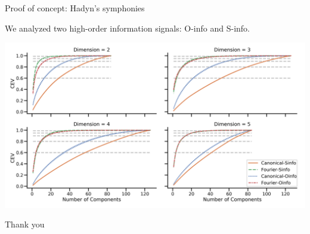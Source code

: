 \documentclass[10pt,t, handout]{beamer} %
\begin{document}
\begin{frame}{Proof of concept: Hadyn's symphonies}
	\vskip 5pt
	\pause
	
	We analyzed two high-order information signals: O-info and S-info.
	
	\vskip 7pt
	\pause
	
	\hspace*{-15pt}\includegraphics[scale=.096]{media/hyperharmonic}
\end{frame}

{
	\begin{frame}
		\vskip 6cm
		\begin{center}
			\textcolor{pblue}{\Huge Thank you}
		\end{center}
	\end{frame}
}
\end{document}
